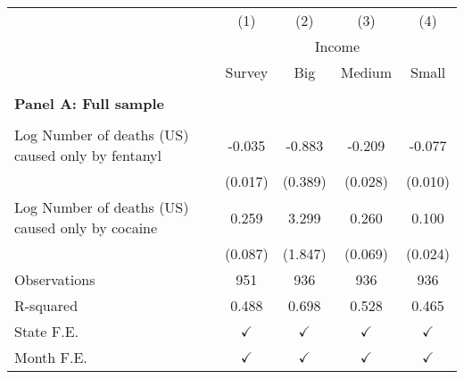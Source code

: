 \begin{tabular}{lcccc} \\ \hline 
                    &\multicolumn{1}{c}{(1)}         &\multicolumn{1}{c}{(2)}         &\multicolumn{1}{c}{(3)}         &\multicolumn{1}{c}{(4)}         \\
 & \multicolumn{4}{c}{Income} \\ \cline{2-5} & Survey  &  \multicolumn{1}{c}{Big} & \multicolumn{1}{c}{Medium}& \multicolumn{1}{c}{Small} \\ \hline   &  &  &  &  \\ \textbf{Panel A: Full sample} \\ & & & & \\
Log Number of deaths (US) caused only by fentanyl&      -0.035\sym{*}  &      -0.883\sym{*}  &      -0.209\sym{***}&      -0.077\sym{***}\\
                    &     (0.017)         &     (0.389)         &     (0.028)         &     (0.010)         \\
\addlinespace
Log Number of deaths (US) caused only by cocaine&       0.259\sym{**} &       3.299         &       0.260\sym{***}&       0.100\sym{***}\\
                    &     (0.087)         &     (1.847)         &     (0.069)         &     (0.024)         \\
\arrayrulecolor{black!10}\midrule
Observations        &         951         &         936         &         936         &         936         \\
R-squared           &       0.488         &       0.698         &       0.528         &       0.465         \\
State F.E.          &$\checkmark$         &$\checkmark$         &$\checkmark$         &$\checkmark$         \\
Month F.E.          &$\checkmark$         &$\checkmark$         &$\checkmark$         &$\checkmark$         \\



\end{tabular}
